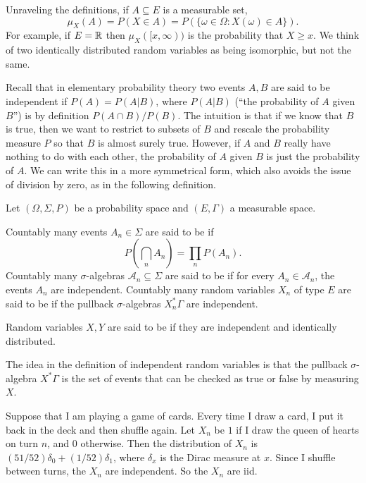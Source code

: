 \begin{subsec}
Unraveling the definitions, if $A \subseteq E$ is a measurable set,
\[\mu_X(A) = P(X \in A) = P(\{\omega \in \Omega: X(\omega) \in A\}).\]
For example, if $E = \mathbb{R}$ then $\mu_X([x, \infty))$ is the probability that $X \geq x$.
We think of two identically distributed random variables as being isomorphic, but not the same.
\end{subsec}

\begin{subsec}
Recall that in elementary probability theory two events $A,B$ are said to be independent if $P(A) = P(A|B)$, where $P(A|B)$ (``the probability of $A$ given $B$'') is by definition $P(A \cap B)/P(B)$.
The intuition is that if we know that $B$ is true, then we want to restrict to subsets of $B$ and rescale the probability measure $P$ so that $B$ is almost surely true.
However, if $A$ and $B$ really have nothing to do with each other, the probability of $A$ given $B$ is just the probability of $A$.
We can write this in a more symmetrical form, which also avoids the issue of division by zero, as in the following definition.
\end{subsec}

\begin{definition}
Let $(\Omega, \Sigma, P)$ be a probability space and $(E, \Gamma)$ a measurable space.

Countably many events $A_{n} \in \Sigma$ are said to be  if
\[P\left(\bigcap_{n} A_{n}\right) = \prod_{n} P(A_{n}).\]
Countably many $\sigma$-algebras $\mathcal A_{n} \subseteq \Sigma$ are said to be  if for every $A_{n} \in \mathcal A_{n}$, the events $A_{n}$ are independent.
Countably many random variables $X_{n}$ of type $E$ are said to be  if the pullback $\sigma$-algebras $X_{n}^*\Gamma$ are independent.

Random variables $X,Y$ are said to be  if they are independent and identically distributed.
\end{definition}

\begin{subsec}
The idea in the definition of independent random variables is that the pullback $\sigma$-algebra $X^*\Gamma$ is the set of events that can be checked as true or false by measuring $X$.
\end{subsec}

\begin{example}
Suppose that I am playing a game of cards.
Every time I draw a card, I put it back in the deck and then shuffle again.
Let $X_{n}$ be $1$ if I draw the queen of hearts on turn $n$, and $0$ otherwise.
Then the distribution of $X_{n}$ is $(51/52)\delta_0 + (1/52)\delta_1$, where $\delta_x$ is the Dirac measure at $x$.
Since I shuffle between turns, the $X_{n}$ are independent.
So the $X_{n}$ are iid.
\end{example}

